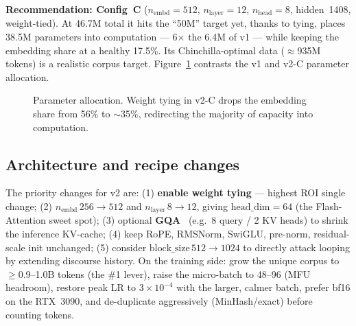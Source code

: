 \documentclass[10pt,twocolumn]{article}
\begin{document}
\textbf{Recommendation: Config~C} ($n_{\text{embd}}{=}512$,
$n_{\text{layer}}{=}12$, $n_{\text{head}}{=}8$, hidden~1408, weight-tied). At
46.7M total it hits the ``50M'' target yet, thanks to tying, places 38.5M
parameters into computation --- 6$\times$ the 6.4M of v1 --- while keeping the
embedding share at a healthy 17.5\%. Its Chinchilla-optimal data ($\approx$935M
tokens) is a realistic corpus target. Figure~\ref{fig:budget} contrasts the
v1 and v2-C parameter allocation.

\begin{figure}[t]
\centering
{}
\caption{Parameter allocation. Weight tying in v2-C drops the embedding share
from 56\% to $\sim$35\%, redirecting the majority of capacity into computation.}
\label{fig:budget}
\end{figure}

\subsection{Architecture and recipe changes}
The priority changes for v2 are: (1) \textbf{enable weight tying} --- highest ROI
single change; (2) $n_{\text{embd}}\,256{\rightarrow}512$ and
$n_{\text{layer}}\,8{\rightarrow}12$, giving $\text{head\_dim}{=}64$ (the
Flash-Attention sweet spot); (3) optional \textbf{GQA}~\cite{gqa} (e.g.\ 8 query
/ 2 KV heads) to shrink the inference KV-cache; (4) keep RoPE, RMSNorm, SwiGLU,
pre-norm, residual-scale init unchanged; (5) consider
$\text{block\_size}\,512{\rightarrow}1024$ to directly attack looping by
extending discourse history. On the training side: grow the unique corpus to
$\geq$0.9--1.0B tokens (the \#1 lever), raise the micro-batch to 48--96 (MFU
headroom), restore peak LR to $3\!\times\!10^{-4}$ with the larger, calmer batch,
prefer bf16 on the RTX~3090, and de-duplicate aggressively (MinHash/exact) before
counting tokens.
\end{document}
